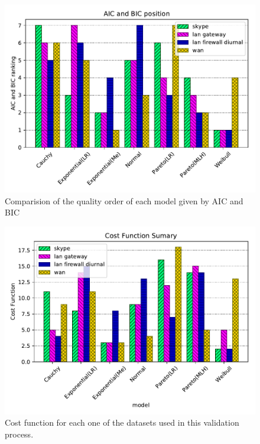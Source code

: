 
\begin{figure}[!ht]
	\centering
	\includegraphics[scale=0.8]{figures/ch4/aic-bic-order}
	\caption{Comparision of the quality order of each model given by AIC and BIC}
	\label{fig:aic-bic-order}
\end{figure}


\begin{figure}[ht!]
\includegraphics[scale=0.8]{figures/ch4/cost-function-summary}
\caption{Cost function for each one of the datasets used in this validation process.}
\label{fig:model-order-cost}
\end{figure}

